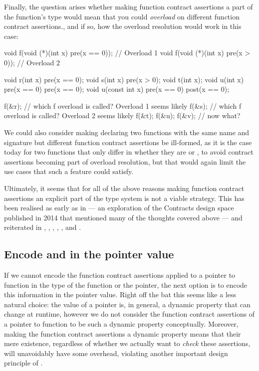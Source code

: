 Finally, the question arises whether making function contract assertions a part of the function's type would mean that you could \emph{overload} on different function contract assertions., and if so, how the overload resolution would work in this case:
\begin{codeblock}
void f(void (*)(int x) pre(x == 0));  // Overload 1
void f(void (*)(int x) pre(x > 0));   // Overload 2

void r(int x) pre(x == 0);
void s(int x) pre(x > 0);
void t(int x);
void u(int x) pre(x == 0) pre(x == 0);
void u(const int x) pre(x == 0) post(x == 0);

f(&r);  // which f overload is called? Overload 1 seems likely
f(&s);  // which f overload is called? Overload 2 seems likely
f(&t);  f(&u);  f(&v); // now what?
\end{codeblock}
We could also consider making declaring two functions with the same name and signature but different function contract assertions be ill-formed, as it is the case today for two functions that only differ in whether they are  or , to avoid contract assertions becoming part of overload resolution, but that would again limit the use cases that such a feature could satisfy.

Ultimately, it seems that for all of the above reasons making function contract assertions an explicit part of the type system is not a viable strategy. This has been realised as early as in \cite{N4110} --- an exploration of the Contracts design space published in 2014 that mentioned many of the thoughts covered above --- and reiterated in \cite{N4415}, \cite{P0246R0}, \cite{P0247R0}, \cite{P0287R0}, \cite{P0380R1}, and \cite{P0542R5}.

\subsection{Encode  and  in the pointer value}

If we cannot encode the function contract assertions applied to a pointer to function in the type of the function or the pointer, the next option is to encode this information in the pointer value. Right off the bat this seems like a less natural choice: the value of a pointer is, in general, a dynamic property that can change at runtime, however we do not consider the function contract assertions of a pointer to function to be such a dynamic property conceptually. Moreover, making the function contract assertions a dynamic property means that their mere existence, regardless of whether we actually want to \emph{check} these assertions, will unavoidably have some overhead, violating another important design principle of \cite{P2900R7}.

